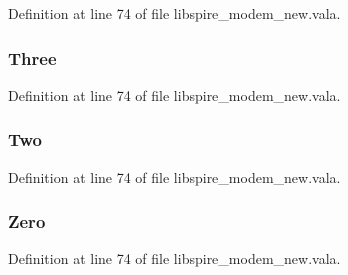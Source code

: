 Definition at line 74 of file libspire\-\_\-modem\-\_\-new.\-vala.

\hypertarget{libspire__modem__new_8vala_a7595488bbd935760242afd8a3a2c0dcd}{
\subsubsection[{Three}]{\setlength{\rightskip}{0pt plus 5cm}Three}}\label{libspire__modem__new_8vala_a7595488bbd935760242afd8a3a2c0dcd}


Definition at line 74 of file libspire\-\_\-modem\-\_\-new.\-vala.

\hypertarget{libspire__modem__new_8vala_ae1ebba61750a87cd3e04f7a0bcc54d41}{
\subsubsection[{Two}]{\setlength{\rightskip}{0pt plus 5cm}Two}}\label{libspire__modem__new_8vala_ae1ebba61750a87cd3e04f7a0bcc54d41}


Definition at line 74 of file libspire\-\_\-modem\-\_\-new.\-vala.

\hypertarget{libspire__modem__new_8vala_ab7be4097d881eae846c441069ed51f24}{
\subsubsection[{Zero}]{\setlength{\rightskip}{0pt plus 5cm}Zero}}\label{libspire__modem__new_8vala_ab7be4097d881eae846c441069ed51f24}


Definition at line 74 of file libspire\-\_\-modem\-\_\-new.\-vala.

